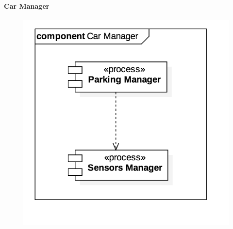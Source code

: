 		\paragraph{Car Manager}
			\begin{figure}[h]
				\includegraphics[scale=0.4, center]{img/component_diagrams/07_car_manager.png}
			\end{figure}
		
		\paragraph{} %
		
		
		
		
